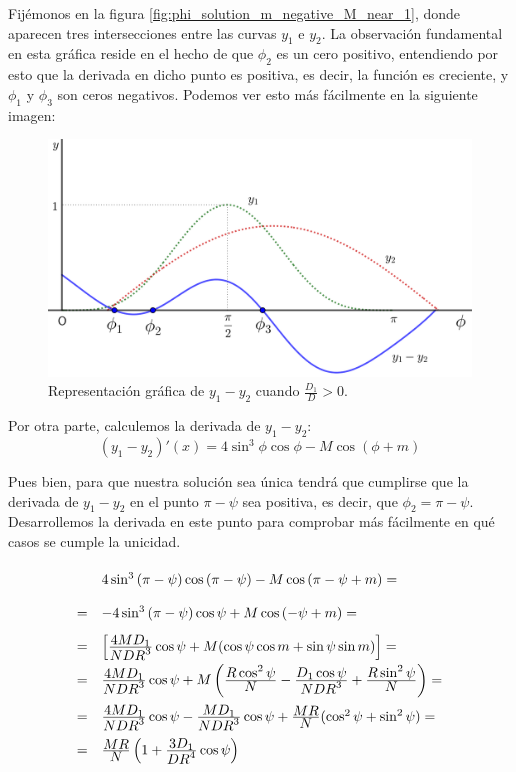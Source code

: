 \documentclass[11pt]{book}
\newcommand\ddfrac[2]{\frac{\displaystyle #1}{\displaystyle #2}}
\begin{document}
Fijémonos en la figura \ref{fig:phi_solution_m_negative_M_near_1}, donde aparecen tres intersecciones entre las curvas $y_1$ e $y_2$. La observación fundamental en esta gráfica reside en el hecho de que $\phi_2$ es un cero positivo, entendiendo por esto que la derivada en dicho punto es positiva, es decir, la función es creciente, y $\phi_1$ y $\phi_3$ son ceros negativos. Podemos ver esto más fácilmente en la siguiente imagen:

\begin{figure}[H]
\centering
\includegraphics[scale=0.125]{images/y_1_menos_y_2.png}
\caption{Representación gráfica de $y_1-y_2$ cuando $\ddfrac{D_1}{D}>0$.}
\label{fig:y_1_menos_y_2}
\end{figure}

Por otra parte, calculemos la derivada de $y_1-y_2$:
\[
(y_1-y_2)'(x)=4\sin^3{\phi}\cos{\phi}-M\cos{(\phi+m)}
\]

Pues bien, para que nuestra solución sea única tendrá que cumplirse que la derivada de $y_1-y_2$ en el punto $\pi-\psi$ sea positiva, es decir, que $\phi_2=\pi-\psi$. Desarrollemos la derivada en este punto para comprobar más fácilmente en qué casos se cumple la unicidad.
\[
\def\arraystretch{2}
\begin{array}{ll}
  & 4\sin^3{(\pi-\psi)}\cos{(\pi-\psi)}-M\cos{(\pi-\psi+m)}=\\
= &-4\sin^3{(\pi-\psi)}\cos{\psi}+M\cos{(-\psi+m)}=\\
= & \left[\ddfrac{4MD_1}{NDR^3}\cos{\psi}+M(\cos{\psi}\cos{m}+\sin{\psi}\sin{m})\right]=\\
= & \ddfrac{4MD_1}{NDR^3}\cos{\psi}+M\left(\ddfrac{R\cos^2{\psi}}{N}-\ddfrac{D_1\cos{\psi}}{NDR^3}+\ddfrac{R\sin^2{\psi}}{N}\right)=\\
= & \ddfrac{4MD_1}{NDR^3}\cos{\psi}-\ddfrac{MD_1}{NDR^3}\cos{\psi}+\ddfrac{MR}{N}(\cos^2{\psi}+\sin^2{\psi})=\\
= & \ddfrac{MR}{N}\left(1+\ddfrac{3D_1}{DR^4}\cos{\psi}\right)
\end{array}
\]
\end{document}
